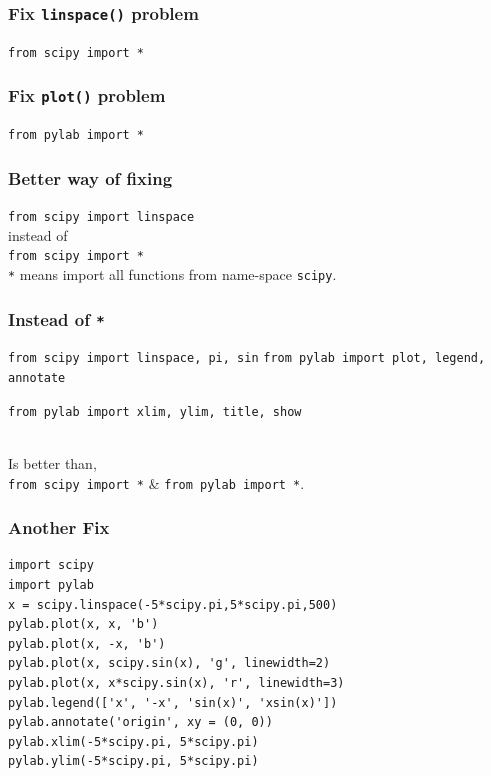 \documentclass[17pt,compress]{beamer}
\begin{document}
\begin{frame}[fragile]
\frametitle{Fix \texttt{linspace()} problem}
\label{sec-7}

\texttt{from scipy import *}
\end{frame}
\begin{frame}[fragile]
\frametitle{Fix \texttt{plot()} problem}
\label{sec-8}
\texttt{from pylab import *}
\end{frame}
\begin{frame}[fragile]
\frametitle{Better way of fixing}
\label{sec-9}

\texttt{from scipy import linspace}\\\pause
\vspace{5pt}
  instead of\\\pause
\vspace{5pt}
\texttt{from scipy import *}\\\pause
\vspace{5pt}
\texttt{*} means import all functions from name-space \texttt{scipy}.
\end{frame}
\begin{frame}[fragile]
\frametitle{Instead of \texttt{*}}
\label{sec-10}
\begin{small}
\texttt{from scipy import linspace, pi, sin}
\texttt{from pylab import plot, legend, annotate}
  
\texttt{from pylab import xlim, ylim, title, show}\pause
\end{small}\\
  Is better than,\\ {\small \texttt{from scipy import *} \& \texttt{from pylab import *}}.
\end{frame}
\begin{frame}[fragile]
\frametitle{Another Fix}
\label{sec-11}

\lstset{language=Python}
\begin{footnotesize}
\begin{lstlisting}
import scipy
import pylab
x = scipy.linspace(-5*scipy.pi,5*scipy.pi,500)
pylab.plot(x, x, 'b')
pylab.plot(x, -x, 'b')
pylab.plot(x, scipy.sin(x), 'g', linewidth=2)
pylab.plot(x, x*scipy.sin(x), 'r', linewidth=3)
pylab.legend(['x', '-x', 'sin(x)', 'xsin(x)'])
pylab.annotate('origin', xy = (0, 0))
pylab.xlim(-5*scipy.pi, 5*scipy.pi)
pylab.ylim(-5*scipy.pi, 5*scipy.pi)
\end{lstlisting}
\end{footnotesize}
\end{frame}
\end{document}
